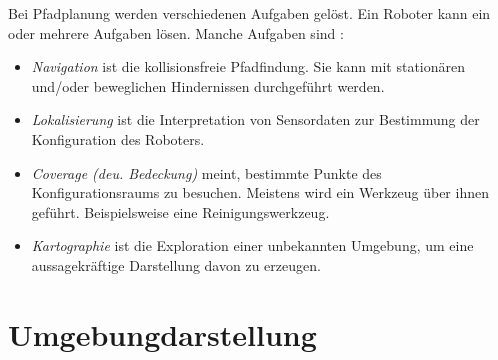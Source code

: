 Bei Pfadplanung werden verschiedenen Aufgaben gelöst. Ein Roboter kann ein oder mehrere Aufgaben lösen. Manche Aufgaben sind \cite[~S. 9,10]{Principles:05}:
\begin{itemize}
	\item \textit{Navigation} ist die kollisionsfreie Pfadfindung. Sie kann mit stationären und/oder beweglichen Hindernissen durchgeführt werden.
	\item \textit{Lokalisierung} ist die Interpretation von Sensordaten zur Bestimmung der Konfiguration des Roboters.
	\item \textit{Coverage (deu. Bedeckung)} meint, bestimmte Punkte des Konfigurationsraums zu besuchen. Meistens wird ein Werkzeug über ihnen geführt. Beispielsweise eine Reinigungswerkzeug.
	\item \textit{Kartographie} ist die Exploration einer unbekannten Umgebung, um eine aussagekräftige Darstellung davon zu erzeugen.
\end{itemize}

\section{Umgebungdarstellung}

